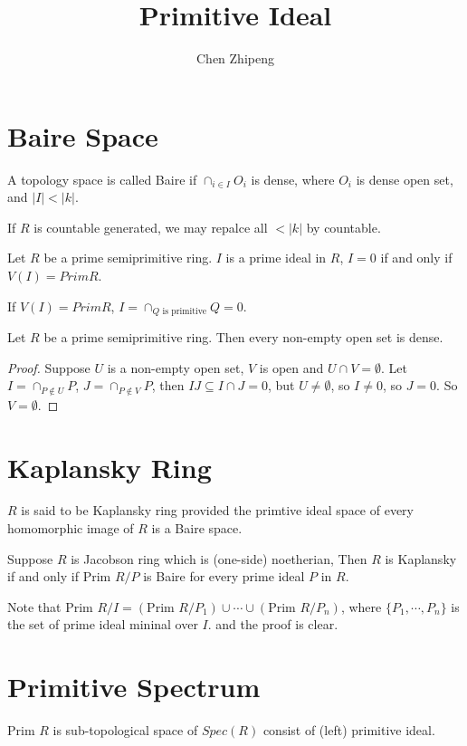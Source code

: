 \documentclass[12pt]{amsart}
\title{Primitive Ideal}
\author{Chen Zhipeng}
\newcommand{\Prim}{ \text{Prim } }
\theoremstyle{plain}
\numberwithin{thm}{section}
\theoremstyle{definition}
\begin{document}
\maketitle

\section*{Baire Space}

 A topology space is called Baire if $\cap_{i \in I} O_i$ is dense, where $O_i$ is dense open set, and $|I| < |k|$.

\remark If $R$ is countable generated, we may repalce all $ < |k|$ by countable.

\lemma Let $R$ be a prime semiprimitive ring. $I$ is a prime ideal in $R$, $I = 0$ if and only if $V(I) = Prim R$.

If $V(I) = Prim R$, $I = \cap_{Q \text{ is primitive}} Q = 0$.

\lemma Let $R$ be a prime semiprimitive ring. Then every non-empty open set is dense.

\begin{proof}
Suppose $U$ is a non-empty open set, $V$ is open and $U \cap V = \emptyset$. Let $I = \cap_{P \notin U} P$, $J = \cap_{P \notin V} P$, then $IJ \subseteq I \cap J = 0$, but $U \neq \emptyset$, so $I \neq 0$, so $J = 0$. So $V = \emptyset$. 
\end{proof} 

\section*{Kaplansky Ring}
 $R$ is said to be Kaplansky ring provided the primtive ideal space of every homomorphic image of $R$ is a Baire space.

\lemma Suppose $R$ is Jacobson ring which is (one-side) noetherian, Then $R$ is Kaplansky if and only if $\Prim R/P$ is Baire for every prime ideal $P$ in $R$.

Note that $\Prim R/I = (\Prim R/P_1) \cup \cdots \cup (\Prim R/P_n)$, where $\{P_1,\cdots, P_n\}$ is the set of prime ideal mininal over $I$. and the proof is clear.

\section*{Primitive Spectrum}

$\Prim R$ is sub-topological space of $Spec(R)$ consist of (left) primitive ideal.
\end{document}
